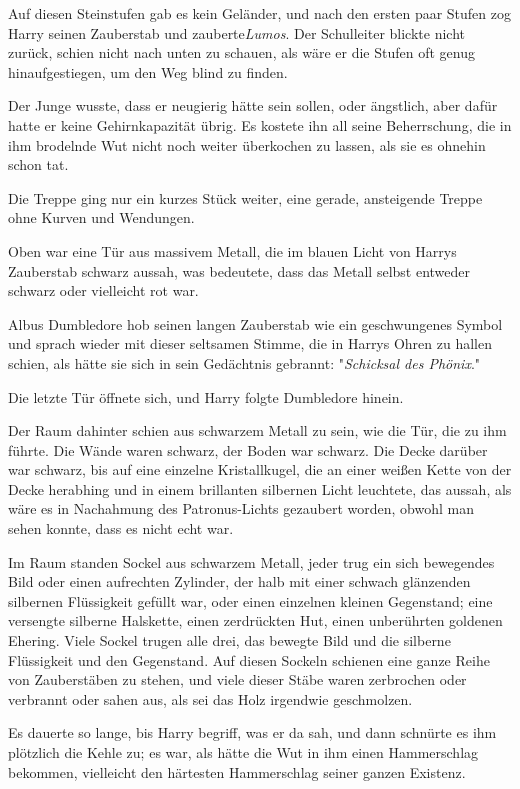 {Auf diesen Steinstufen gab es kein Geländer, und nach den ersten paar Stufen zog Harry seinen Zauberstab und zauberte\emph{Lumos}. Der Schulleiter blickte nicht zurück, schien nicht nach unten zu schauen, als wäre er die Stufen oft genug hinaufgestiegen, um den Weg blind zu finden.

Der Junge wusste, dass er neugierig hätte sein sollen, oder ängstlich, aber dafür hatte er keine Gehirnkapazität übrig. Es kostete ihn all seine Beherrschung, die in ihm brodelnde Wut nicht noch weiter überkochen zu lassen, als sie es ohnehin schon tat.

Die Treppe ging nur ein kurzes Stück weiter, eine gerade, ansteigende Treppe ohne Kurven und Wendungen.

Oben war eine Tür aus massivem Metall, die im blauen Licht von Harrys Zauberstab schwarz aussah, was bedeutete, dass das Metall selbst entweder schwarz oder vielleicht rot war.

Albus Dumbledore hob seinen langen Zauberstab wie ein geschwungenes Symbol und sprach wieder mit dieser seltsamen Stimme, die in Harrys Ohren zu hallen schien, als hätte sie sich in sein Gedächtnis gebrannt: "\emph{Schicksal des Phönix}."

Die letzte Tür öffnete sich, und Harry folgte Dumbledore hinein.

Der Raum dahinter schien aus schwarzem Metall zu sein, wie die Tür, die zu ihm führte. Die Wände waren schwarz, der Boden war schwarz. Die Decke darüber war schwarz, bis auf eine einzelne Kristallkugel, die an einer weißen Kette von der Decke herabhing und in einem brillanten silbernen Licht leuchtete, das aussah, als wäre es in Nachahmung des Patronus-Lichts gezaubert worden, obwohl man sehen konnte, dass es nicht echt war.

Im Raum standen Sockel aus schwarzem Metall, jeder trug ein sich bewegendes Bild oder einen aufrechten Zylinder, der halb mit einer schwach glänzenden silbernen Flüssigkeit gefüllt war, oder einen einzelnen kleinen Gegenstand; eine versengte silberne Halskette, einen zerdrückten Hut, einen unberührten goldenen Ehering. Viele Sockel trugen alle drei, das bewegte Bild und die silberne Flüssigkeit und den Gegenstand. Auf diesen Sockeln schienen eine ganze Reihe von Zauberstäben zu stehen, und viele dieser Stäbe waren zerbrochen oder verbrannt oder sahen aus, als sei das Holz irgendwie geschmolzen.

Es dauerte so lange, bis Harry begriff, was er da sah, und dann schnürte es ihm plötzlich die Kehle zu; es war, als hätte die Wut in ihm einen Hammerschlag bekommen, vielleicht den härtesten Hammerschlag seiner ganzen Existenz.

}
